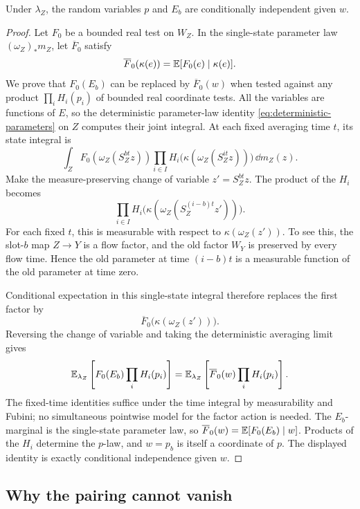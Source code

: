 \begin{lemma}
\label{lem:parameter-independence}
Under $\lambda_Z$, the random variables $p$ and $E_b$ are
conditionally independent given $w$.
\end{lemma}

\begin{proof}
Let $F_0$ be a bounded real test on $W_Z$. In the single-state
parameter law $(\omega_Z)_*m_Z$, let $\overline F_0$ satisfy
\[
 \overline F_0(\kappa(e))=\mathbb E[F_0(e)\mid\kappa(e)].
\]
We prove that $F_0(E_b)$ can be replaced by
$\overline F_0(w)$ when tested against any product
$\prod_i H_i(p_i)$ of bounded real coordinate tests. All the
variables are functions of $E$, so the deterministic parameter-law
identity \eqref{eq:deterministic-parameters} on $Z$ computes their
joint integral. At each fixed averaging time $t$, its state integral
is
\[
 \int_Z F_0(\omega_Z(S_Z^{bt}z))
    \prod_{i\in I}H_i\big(\kappa(\omega_Z(S_Z^{it}z))\big)
    \,\dd m_Z(z).
\]
Make the measure-preserving change of variable $z'=S_Z^{bt}z$.
The product of the $H_i$ becomes
\[
 \prod_{i\in I}H_i\big(
    \kappa(\omega_Z(S_Z^{(i-b)t}z'))\big).
\]
For each fixed $t$, this is measurable with respect to
$\kappa(\omega_Z(z'))$. To see this, the slot-$b$ map $Z\to Y$
is a flow factor, and the old factor $W_Y$ is preserved by every
flow time. Hence the old parameter at time $(i-b)t$ is a measurable
function of the old parameter at time zero.

Conditional expectation in this single-state integral therefore
replaces the first factor by
\[
 \overline F_0\bigl(\kappa(\omega_Z(z'))\bigr).
\]
Reversing the change of
variable and taking the deterministic averaging limit gives
\[
 \mathbb E_{\lambda_Z}\left[F_0(E_b)\prod_i H_i(p_i)\right]
 =\mathbb E_{\lambda_Z}\left[\overline F_0(w)\prod_i H_i(p_i)\right].
\]
The fixed-time identities suffice under the time integral by
measurability and Fubini; no simultaneous pointwise model for the
factor action is needed. The $E_b$-marginal is the single-state
parameter law, so $\overline F_0(w)=\mathbb E[F_0(E_b)\mid w]$.
Products of the $H_i$ determine the $p$-law, and $w=p_b$ is itself
a coordinate of $p$. The displayed identity is exactly conditional
independence given $w$.
\end{proof}

\subsection{Why the pairing cannot vanish}


